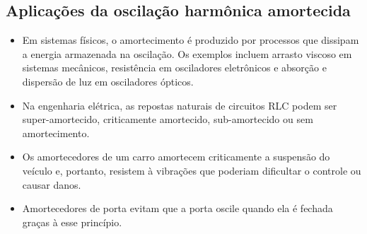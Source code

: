 \subsection{Aplicações da oscilação harmônica amortecida}

\begin{itemize}
\item Em sistemas físicos, o amortecimento é produzido por processos que dissipam a energia armazenada na oscilação. Os exemplos incluem arrasto viscoso em sistemas mecânicos, resistência em osciladores eletrônicos e absorção e dispersão de luz em osciladores ópticos. 
\item Na engenharia elétrica, as repostas naturais de circuitos RLC podem ser super-amortecido, criticamente amortecido, sub-amortecido ou sem amortecimento.
\item Os amortecedores de um carro amortecem criticamente a suspensão do veículo e, portanto, resistem à vibrações que poderiam dificultar o controle ou causar danos. 
\item Amortecedores de porta evitam que a porta oscile quando ela é fechada graças à esse princípio.
\end{itemize}